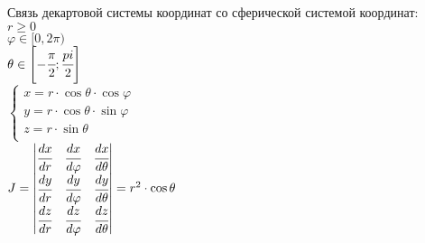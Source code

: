 \documentclass[a4paper]{article}
\begin{document}
\begin{enumerate}
Связь декартовой системы координат со сферической системой координат: \\
$r \geqslant 0$ \\
$\varphi \in [0, 2\pi)$ \\
$\theta \in \left[ -\cfrac{\pi}{2}; \cfrac{pi}{2} \right]$ \\
$\begin{cases}
	x = r \cdot \cos{\theta} \cdot \cos{\varphi} \\
	y = r \cdot \cos{\theta} \cdot \sin{\varphi} \\
	z = r \cdot \sin{\theta} \\
\end{cases}$ \\
$J = 
\begin{vmatrix}
	\cfrac{dx}{dr} & \cfrac{dx}{d\varphi} & \cfrac{dx}{d\theta} \\
	\cfrac{dy}{dr} & \cfrac{dy}{d\varphi} & \cfrac{dy}{d\theta} \\
	\cfrac{dz}{dr} & \cfrac{dz}{d\varphi} & \cfrac{dz}{d\theta} \\
\end{vmatrix} = r^2 \cdot \cos{\theta}$


\end{enumerate}
\end{document}
